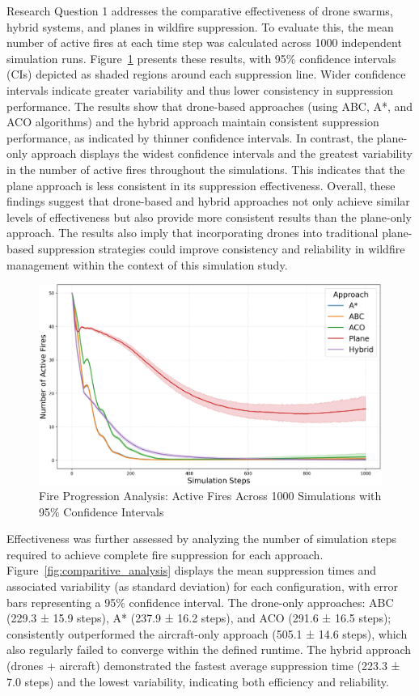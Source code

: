 \documentclass[11pt, a4paper]{article}
\begin{document}
Research Question 1 addresses the comparative effectiveness of drone swarms, hybrid systems, and planes in wildfire suppression. To evaluate this, the mean number of active fires at each time step was calculated across 1000 independent simulation runs. Figure~\ref{fig:comparitive_analysislineplot} presents these results, with 95\% confidence intervals (CIs) depicted as shaded regions around each suppression line. Wider confidence intervals indicate greater variability and thus lower consistency in suppression performance.
The results show that drone-based approaches (using ABC, A*, and ACO algorithms) and the hybrid approach maintain consistent suppression performance, as indicated by thinner confidence intervals. In contrast, the plane-only approach displays the widest confidence intervals and the greatest variability in the number of active fires throughout the simulations. This indicates that the plane approach is less consistent in its suppression effectiveness.
Overall, these findings suggest that drone-based and hybrid approaches not only achieve similar levels of effectiveness but also provide more consistent results than the plane-only approach. The results also imply that incorporating drones into traditional plane-based suppression strategies could improve consistency and reliability in wildfire management within the context of this simulation study.

\begin{figure}[htbp]
    \centering
    \includegraphics[width=1\linewidth]{figures/fire_progression_analysis.jpeg}
    \caption{Fire Progression Analysis: Active Fires Across 1000 Simulations with 95\% Confidence Intervals}
    \label{fig:comparitive_analysislineplot}
\end{figure}

Effectiveness was further assessed by analyzing the number of simulation steps required to achieve complete fire suppression for each approach. Figure~\ref{fig:comparitive_analysis} displays the mean suppression times and associated variability (as standard deviation) for each configuration, with error bars representing a 95\% confidence interval.
The drone-only approaches: ABC (229.3 ± 15.9 steps), A* (237.9 ± 16.2 steps), and ACO (291.6 ± 16.5 steps); consistently outperformed the aircraft-only approach (505.1 ± 14.6 steps), which also regularly failed to converge within the defined runtime. The hybrid approach (drones + aircraft) demonstrated the fastest average suppression time (223.3 ± 7.0 steps) and the lowest variability, indicating both efficiency and reliability.
\end{document}
